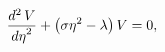 \[\frac{{d}^{2}\mathop{V\/}\nolimits}{{d\eta}^{2}}+\left(\sigma\eta^{2}-\lambda%
\right)\mathop{V\/}\nolimits=0,\]